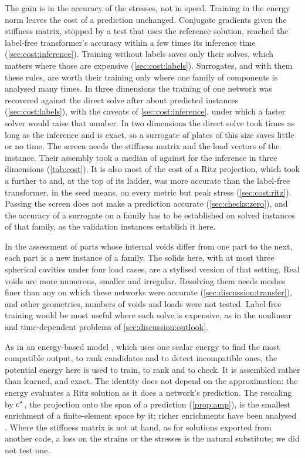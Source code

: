The gain is in the accuracy of the stresses, not in speed. Training in the energy norm leaves
the cost of a prediction unchanged. Conjugate gradients given the stiffness matrix, stopped by
a test that uses the reference solution, reached the label-free transformer's accuracy within a few
times its inference time (\cref{sec:cost:inference}). Training without labels saves only their
solves, which matters where those are expensive (\cref{sec:cost:labels}). Surrogates, and with them these
rules, are worth their training only where one family of components is analysed many times.
In three dimensions the training of one network was recovered against the direct solve after
about \numCostBreakEvenDirect{} predicted instances (\cref{sec:cost:labels}), with the
caveats of \cref{sec:cost:inference}, under which a faster solver would raise that number. In two dimensions the direct solve took \numCostTwoDirectRatio{} times as long as the inference
and is exact, so a surrogate of plates of this size saves little or no time. The screen needs the stiffness matrix and the load vectors of the instance. Their assembly
took a median of \numCostAsmVal{} against \numCostSurrVal{} for the inference in three
dimensions (\cref{tab:cost}). It is also most of the cost of a Ritz projection, which took a further
\numCostRitzValMin{} to \numCostRitzValMax{} and, at the top of its ladder, was more accurate
than the label-free transformer, in the seed means, on every metric but peak stress
(\cref{sec:cost:ritz}). Passing the screen does not make a prediction accurate
(\cref{sec:checks:zero}), and the accuracy of a surrogate on a family has to be established on
solved instances of that family, as the validation instances establish it here.

In the assessment of parts whose internal voids differ from one part to the next, each part is a new instance of a family. The solids here, with at most three spherical cavities under
four load cases, are a stylised version of that setting. Real voids are more numerous, smaller and irregular. Resolving them needs meshes finer than any on which these networks
were accurate (\cref{sec:discussion:transfer}), and other geometries, numbers of voids and
loads were not tested. Label-free training would be most useful where each solve is expensive, as
in the nonlinear and time-dependent problems of \cref{sec:discussion:outlook}.

As in an energy-based model
\cite{LeCun2007EBM}, which uses one scalar energy to find the most compatible output, to rank
candidates and to detect incompatible ones, the potential energy here is used to train, to rank and to check. It is assembled rather than learned, and exact. The identity does not
depend on the approximation: the energy evaluates a Ritz solution as it does a network's prediction. The rescaling by $c^{\ast}$, the projection onto the span of a prediction
(\cref{prop:amp}), is the smallest enrichment of a finite-element space by it; richer
enrichments have been analysed \cite{Barucq2026Enrich}. Where the stiffness matrix is not at
hand, as for solutions exported from another code, a loss on the strains or the stresses is
the natural substitute; we did not test one.

